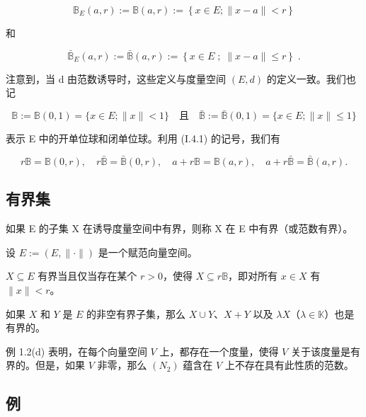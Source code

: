 \[
\mathbb{B}_{E}(a,r):=\mathbb{B}(a,r):=\left\{x\in E;\|x-a\|<r\right\}
\]

和

\[
\bar{\mathbb{B}}_{E}(a,r):=\bar{\mathbb{B}}(a,r):=\left\{x\in E\;;\;\|x-a\|\leq r\right\}\;.
\]

注意到，当 d 由范数诱导时，这些定义与度量空间 $ (E,d) $ 的定义一致。我们也记

\[
\mathbb{B}:=\mathbb{B}(0,1)=\{x\in E;\|x\|<1\}\quad\text{且}\quad\bar{\mathbb{B}}:=\bar{\mathbb{B}}(0,1)=\{x\in E;\|x\|\leq1\}
\]

表示 E 中的开单位球和闭单位球。利用 (I.4.1) 的记号，我们有

\[
r\mathbb{B}=\mathbb{B}(0,r),\quad r\bar{\mathbb{B}}=\bar{\mathbb{B}}(0,r),\quad a+r\mathbb{B}=\mathbb{B}(a,r),\quad a+r\bar{\mathbb{B}}=\bar{\mathbb{B}}(a,r).
\]

\subsection*{有界集}

如果 E 的子集 X 在诱导度量空间中有界，则称 X 在 E 中有界（或范数有界）。

\begin{remark}

设 $ E := (E, \|\cdot\|) $ 是一个赋范向量空间。

\begin{items}
\item

$ X \subseteq E $ 有界当且仅当存在某个 $ r > 0 $，使得 $ X \subseteq r\mathbb{B} $，即对所有 $ x \in X $ 有 $ \|x\| < r $。

\item

如果 $X$ 和 $Y$ 是 $E$ 的非空有界子集，那么 $X \cup Y$、$X + Y$ 以及 $\lambda X$（$\lambda \in \mathbb{K}$）也是有界的。

\item

例 1.2(d) 表明，在每个向量空间 $V$ 上，都存在一个度量，使得 $V$ 关于该度量是有界的。但是，如果 $V$ 非零，那么 $(N_{2})$ 蕴含在 $V$ 上不存在具有此性质的范数。

\end{items}

\end{remark}

\subsection*{例}

